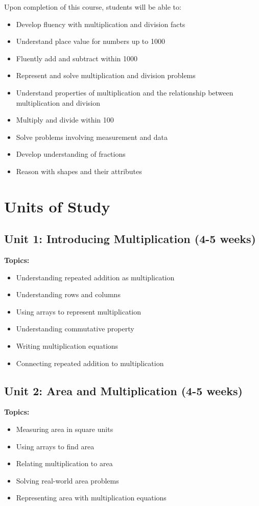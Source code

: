\documentclass[11pt,letterpaper]{report}
\begin{document}
Upon completion of this course, students will be able to:

\begin{itemize}
    \item Develop fluency with multiplication and division facts
    \item Understand place value for numbers up to 1000
    \item Fluently add and subtract within 1000
    \item Represent and solve multiplication and division problems
    \item Understand properties of multiplication and the relationship between multiplication and division
    \item Multiply and divide within 100
    \item Solve problems involving measurement and data
    \item Develop understanding of fractions
    \item Reason with shapes and their attributes
\end{itemize}

\section{Units of Study}

\subsection{Unit 1: Introducing Multiplication (4-5 weeks)}

\textbf{Topics:}
\begin{itemize}
    \item Understanding repeated addition as multiplication
    \item Understanding rows and columns
    \item Using arrays to represent multiplication
    \item Understanding commutative property
    \item Writing multiplication equations
    \item Connecting repeated addition to multiplication
\end{itemize}

\subsection{Unit 2: Area and Multiplication (4-5 weeks)}

\textbf{Topics:}
\begin{itemize}
    \item Measuring area in square units
    \item Using arrays to find area
    \item Relating multiplication to area
    \item Solving real-world area problems
    \item Representing area with multiplication equations
\end{itemize}
\end{document}
